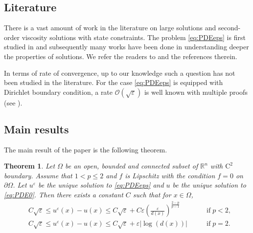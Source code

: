 \documentclass[11pt,reqno]{amsart}
\numberwithin{figure}{section}
\theoremstyle{plain}
\newtheorem{thm}{Theorem}[section]
\theoremstyle{remark}
\numberwithin{equation}{section}
\newcommand{\R}{\mathbb{R}}
\begin{document}

\subsection{Literature} There is a
vast amount of work in the literature on large solutions and second-order viscosity solutions with state constraints. The problem \eqref{eq:PDEeps} is first studied in \cite{Lasry1989} and subsequently many works have been done in understanding deeper the properties of solutions. We refer the readers to \cite{alessio_asymptotic_2006} and the references therein. 

In terms of rate of convergence, up to our knowledge such a question has not been studied in the literature. For the case \eqref{eq:PDEeps} is equipped with Dirichlet boundary condition, a rate $\mathcal{O}(\sqrt{\varepsilon})$ is well known with multiple proofs (see \cite{tran_hamilton-jacobi_2021}). 

\subsection{Main results} The main result of the paper is the following theorem.


\begin{thm} Let $\Omega$ be an open, bounded and connected subset of $\R^n$ with $\mathrm{C}^2$ boundary. Assume that $1 < p\leq 2$ and $f$ is Lipschitz with the condition $f = 0$ on $\partial\Omega$. Let $u^\varepsilon$ be the unique solution to \eqref{eq:PDEeps} and $u$ be the unique solution to \eqref{eq:PDE0}. Then there exists a constant $C$ such that for $x\in \Omega$,
\begin{align*}
    &C\sqrt{\varepsilon}\leq  u^\varepsilon(x) - u(x)\leq C\sqrt{\varepsilon} + C\varepsilon \left(\frac{\varepsilon}{d(x)}\right)^{\frac{2-p}{p-1}} &\qquad\text{if}\; p < 2,\\
    &C\sqrt{\varepsilon}\leq  u^\varepsilon(x) - u(x)\leq C\sqrt{\varepsilon} + \varepsilon|\log(d(x))| &\qquad\text{if}\; p = 2.
\end{align*}
\end{thm}
\end{document}
